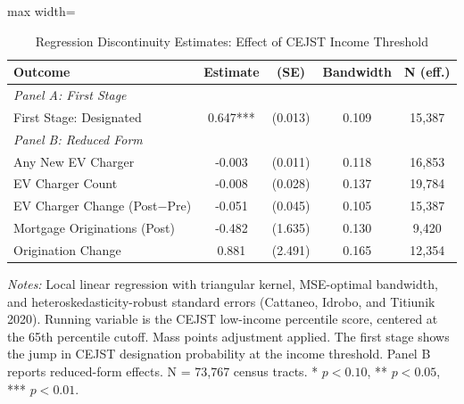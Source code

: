 \begin{table}[H]
\centering
\caption{Regression Discontinuity Estimates: Effect of CEJST Income Threshold}
\begin{threeparttable}
\begin{adjustbox}{max width=\textwidth}
\begin{tabular}{lcccc}
\toprule
Outcome & Estimate & (SE) & Bandwidth & N (eff.) \\
\midrule
\multicolumn{5}{l}{\textit{Panel A: First Stage}} \\[3pt]
First Stage: Designated & 0.647*** & (0.013) & 0.109 & 15,387 \\

\midrule
\multicolumn{5}{l}{\textit{Panel B: Reduced Form}} \\[3pt]
Any New EV Charger & -0.003 & (0.011) & 0.118 & 16,853 \\
EV Charger Count & -0.008 & (0.028) & 0.137 & 19,784 \\
EV Charger Change (Post$-$Pre) & -0.051 & (0.045) & 0.105 & 15,387 \\
Mortgage Originations (Post) & -0.482 & (1.635) & 0.130 & 9,420 \\
Origination Change & 0.881 & (2.491) & 0.165 & 12,354 \\
\bottomrule
\end{tabular}
\end{adjustbox}
\begin{tablenotes}[flushleft]
\small
\item \textit{Notes:} Local linear regression with triangular kernel, MSE-optimal bandwidth, and heteroskedasticity-robust standard errors (Cattaneo, Idrobo, and Titiunik 2020). Running variable is the CEJST low-income percentile score, centered at the 65th percentile cutoff. Mass points adjustment applied. The first stage shows the jump in CEJST designation probability at the income threshold. Panel B reports reduced-form effects. N = 73,767 census tracts. * $p<0.10$, ** $p<0.05$, *** $p<0.01$.
\end{tablenotes}
\end{threeparttable}
\label{tab:main}
\end{table}

